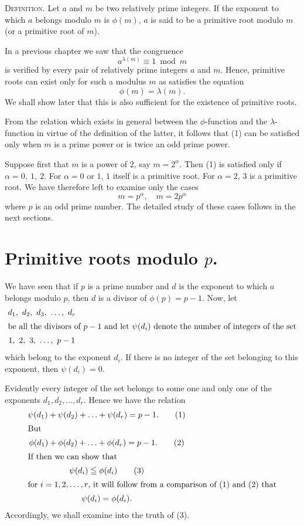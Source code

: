 \documentclass[oneside]{book}
\begin{document}
\textsc{Definition.} Let $a$ and $m$ be two relatively prime
integers. If the exponent to which $a$ belongs modulo $m$ is
$\phi(m)$, $a$ is said to be a primitive root modulo $m$ (or a
primitive root of $m$).

In a previous chapter we saw that the congruence
\begin{equation*}
a^{\lambda(m)} \equiv 1 \bmod m
\end{equation*}
is verified by every pair of relatively prime integers $a$ and $m$.
Hence, primitive roots can exist only for such a modulus $m$ as
satisfies the equation
\begin{equation*}
\phi(m) = \lambda(m). \tag{1}
\end{equation*}
We shall show later that this is also sufficient for the existence
of primitive roots.

From the relation which exists in general between the
$\phi$-function and the $\lambda$-function in virtue of the
definition of the latter, it follows that (1) can be satisfied only
when $m$ is a prime power or is twice an odd prime power.

Suppose first that $m$ is a power of $2$, say $m = 2^\alpha$. Then
(1) is satisfied only if $\alpha = 0,\ 1,\ 2$. For $\alpha = 0$ or
$1$, $1$ itself is a primitive root. For $\alpha = 2$, $3$ is a
primitive root. We have therefore left to examine only the cases
\begin{equation*}
m = p^\alpha,\quad m = 2p^\alpha
\end{equation*}
where $p$ is an odd prime number. The detailed study of these cases
follows in the next sections.

\section{Primitive roots modulo $p$.}\label{s35}

We have seen that if $p$ is a prime number and $d$ is the exponent
to which $a$ belongs modulo $p$, then $d$ is a divisor of $\phi(p) =
p - 1$. Now, let
\begin{gather*}
d_1,\ d_2,\ d_3,\ \ldots,\ d_r \\
\intertext{be all the divisors of $p-1$ and let $\psi(d_i)$ denote
the number of integers of the set}
1,\ 2,\ 3,\ \ldots,\ p-1
\end{gather*}
which belong to the exponent $d_i$. If there is no integer of the
set belonging to this exponent, then $\psi(d_i) = 0$.

Evidently every integer of the set belongs to some one and only one
of the exponents $d_1, d_2, \ldots, d_r$. Hence we have the relation
\begin{gather}
\psi(d_1) + \psi(d_2) + \ldots + \psi(d_r) = p-1. \tag{1} \\
\intertext{But}
\phi(d_1) + \phi(d_2) + \ldots + \phi(d_r) = p-1. \tag{2} \\
\intertext{If then we can show that}
\psi(d_i) \leqq \phi(d_i) \tag{3} \\
\intertext{for $i = 1, 2, \ldots, r$, it will follow from a
comparison of (1) and (2) that}
\psi(d_i) = \phi(d_i). \notag
\end{gather}
Accordingly, we shall examine into the truth of (3).
\end{document}
